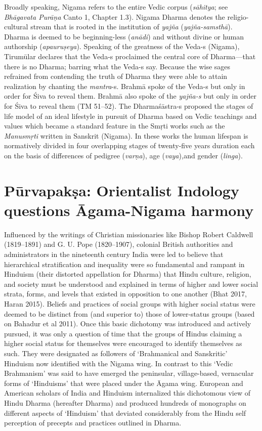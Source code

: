 Broadly speaking, Nigama refers to the entire Vedic corpus (\textit{sāhitya}; see \textit{Bhāgavata Purāṇa} Canto 1, Chapter 1.3). Nigama Dharma denotes the religio-cultural stream that is rooted in the institution of \textit{yajña} (\textit{yajña-samsthā}). Dharma is deemed to be beginning-less (\textit{anādi}) and without divine or human authorship (\textit{apauruṣeya}). Speaking of the greatness of the Veda-s (Nigama), Tirumūlar declares that the Veda-s proclaimed the central core of Dharma—that there is no Dharma; barring what the Veda-s say. Because the wise sages refrained from contending the truth of Dharma they were able to attain realization by chanting the \textit{mantra}-s. Brahmā spoke of the Veda-s but only in order for Śiva to reveal them. Brahmā also spoke of the \textit{yajña-s} but only in order for Śiva to reveal them (TM 51–52). The Dharmaśāstra-s proposed the stages of life model of an ideal lifestyle in pursuit of Dharma based on Vedic teachings and values which became a standard feature in the Smṛti works such as the \textit{Manusmṛti}  written in Sanskrit (Nigama). In these works the human lifespan is normatively divided in four overlapping stages of twenty-five years duration each on the basis of differences of pedigree (\textit{varṇa}), age (\textit{vaya})\textit{,}and gender (\textit{linga}).


\section*{Pūrvapakṣa: Orientalist Indology questions Āgama-Nigama harmony}

Influenced by the writings of Christian missionaries like Bishop Robert Caldwell (1819–1891) and G. U. Pope (1820–1907), colonial British authorities and administrators in the nineteenth century India were led to believe that hierarchical stratification and inequality were so fundamental and rampant in Hinduism (their distorted appellation for Dharma) that Hindu culture, religion, and society must be understood and explained in terms of higher and lower social strata, forms, and levels that existed in opposition to one another (Bhat 2017, Haran 2015). Beliefs and practices of social groups with higher social status were deemed to be distinct from (and superior to) those of lower-status groups (based on Bahadur et al 2011). Once this basic dichotomy was introduced and actively pursued, it was only a question of time that the groups of Hindus claiming a higher social status for themselves were encouraged to identify themselves as such. They were designated as followers of ‘Brahmanical and Sanskritic’ Hinduism now identified with the Nigama wing. In contrast to this ‘Vedic Brahmanism’ was said to have emerged the peninsular, village-based, vernacular forms of ‘Hinduisms’ that were placed under the Āgama wing. European and American scholars of India and Hinduism internalized this dichotomous view of Hindu Dharma (hereafter Dharma) and produced hundreds of monographs on different aspects of ‘Hinduism’ that deviated considerably from the Hindu self perception of precepts and practices outlined in Dharma.

